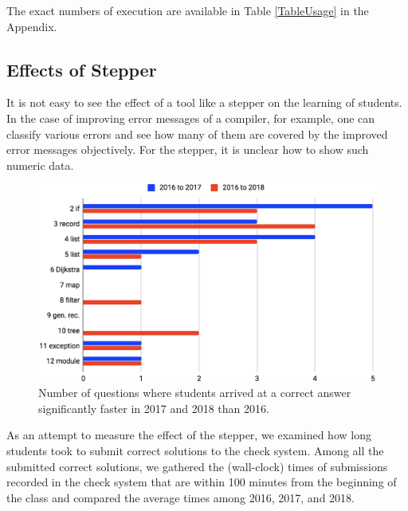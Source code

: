 The exact numbers of execution are available in Table \ref{TableUsage} in the Appendix.

\subsection{Effects of Stepper}
It is not easy to see the effect of a tool like a stepper on
the learning of students.
In the case of improving error messages of a compiler, for example,
one can classify various errors and see how many of them are covered
by the improved error messages objectively.
For the stepper, it is unclear how to show such numeric data.

\begin{figure}
  \begin{center}
    \includegraphics[width=15cm]{5/table2.eps}
    \caption{Number of questions where students arrived at a correct answer significantly faster in 2017 and 2018 than 2016.}
    \label{figure:p}
  \end{center}
\end{figure}

As an attempt to measure the effect of the stepper, we examined how
long students took to submit correct solutions to the check system.
Among all the submitted correct solutions, we gathered the (wall-clock) times of
submissions recorded in the check system that are within 100 minutes
from the beginning of the class and compared the average times among
2016, 2017, and 2018.

